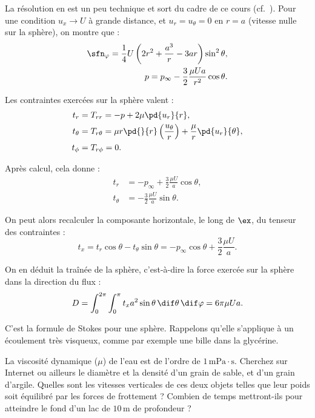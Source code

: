 \begin{redmargin}
La résolution en est un peu technique et sort du cadre de ce cours (cf.~\cite[p.~225]{acheson01aa}). Pour une condition $u_x \rightarrow U$ à grande distance, et $u_r = u_\theta = 0$ en $r = a$ (vitesse nulle sur la sphère), on montre que :
\begin{align}
  \sfn_\varphi = \frac{1}{4}U\left( 2r^2 + \frac{a^3}{r} - 3 a r\right) \sin^2\theta, \label{eq:sol_psi} \\
  p = p_\infty - \frac{3}{2} \frac{\mu U a}{r^2} \cos\theta.
\end{align}

Les contraintes exercées sur la sphère valent :
\begin{align*}
  t_r &= T_{rr} = - p + 2\mu \pd{u_r}{r}, \\
  t_\theta &= T_{r\theta} = \mu r \pd{}{r}\left(\frac{u_\theta}{r}\right) + \frac{\mu}{r}\pd{u_r}{\theta}, \\
  t_\phi &= T_{r\phi} = 0.
\end{align*}

Après calcul, cela donne :
\begin{align*}
  t_r &= -p_\infty + \frac{3}{2}\frac{\mu U}{a}\cos\theta, \\
  t_\theta &= -\frac{3}{2}\frac{\mu U}{a}\sin\theta.
\end{align*}

On peut alors recalculer la composante horizontale, le long de $\ex$, du tenseur des contraintes :
\begin{displaymath}
  t_x = t_r \cos\theta - t_\theta \sin\theta = -p_\infty \cos\theta + \frac{3}{2}\frac{\mu U}{a}.
\end{displaymath}

On en déduit la traînée de la sphère, c'est-à-dire la force exercée sur la sphère dans la direction du flux :
\begin{equation}
  D = \int_0^{2\pi}\int_{0}^{\pi} t_x a^2 \sin\theta\, \dif \theta\, \dif\varphi = 6\pi \mu U a.
  \label{eq:stokes_sphere}
\end{equation}

C'est la formule de Stokes pour une sphère. Rappelons qu'elle s'applique à un écoulement très visqueux, comme par exemple une bille dans la glycérine.

\end{redmargin}

\begin{studentinvestigation}
  La viscosité dynamique ($\mu$) de l'eau est de l'ordre de $1\,\textrm{mPa}\cdot\textrm{s}$. Cherchez sur Internet ou ailleurs le diamètre et la densité d'un grain de sable, et d'un grain d'argile. Quelles sont les vitesses verticales de ces deux objets telles que leur poids soit équilibré par les forces de frottement ? Combien de temps mettront-ils pour atteindre le fond d'un lac de $10\,\mathrm{m}$ de profondeur ?
\end{studentinvestigation}
